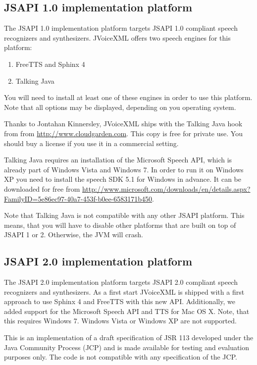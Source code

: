\documentclass[11pt,a4paper]{book}
\begin{document}
\subsection{JSAPI 1.0 implementation platform}

The JSAPI 1.0 implementation platform targets JSAPI 1.0 compliant speech
recognizers and synthesizers. JVoiceXML offers two speech engines for this
platform:
\begin{enumerate}
  \item FreeTTS and Sphinx 4
  \item Talking Java
\end{enumerate}

You will need to install at least one of these engines in order to use this
platform. Note that all options may be displayed, depending on you operating
system.

Thanks to Jontahan Kinnersley, JVoiceXML ships with the Talking Java hook from
from \url{http://www.cloudgarden.com}. This copy is free for
private use. You should buy a license if you use it in a commercial setting.

Talking Java requires an installation of the Microsoft Speech API, which is
already part of Windows Vista and Windows 7. In order to run it on Windows XP
you need to install the speech SDK 5.1 for Windows in advance. It can be
downloaded for free from
\url{http://www.microsoft.com/downloads/en/details.aspx?FamilyID=5e86ec97-40a7-453f-b0ee-6583171b450}.

Note that Talking Java is not compatible with any other JSAPI platform. This
means, that you will have to disable other platforms that are built on top of
JSAPI 1 or 2. Otherwise, the JVM will crash.

\subsection{JSAPI 2.0 implementation platform}

The JSAPI 2.0 implementation platform targets JSAPI 2.0 compliant speech
recognizers and synthesizers. As a first start JVoiceXML is shipped with a
first approach to use Sphinx 4 and FreeTTS with this new API. Additionally,
we added support for the Microsoft Speech API and TTS for Mac OS X.
Note, that this requires Windows 7. Windows Vista or Windows XP are not
supported. 

This is an implementation of a draft specification of JSR 113 developed under
the Java Community Process (JCP) and is made available for testing and evaluation
purposes only. The code is not compatible with any specification of the JCP.
\end{document}

